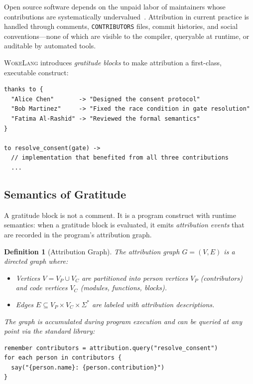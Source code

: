 \documentclass[11pt,a4paper]{article}
\newtheorem{definition}[theorem]{Definition}
\newcommand{\WokeLang}{\textsc{WokeLang}}
\begin{document}
Open source software depends on the unpaid labor of maintainers whose
contributions are systematically
undervalued~\citep{eghbal2020working}.  Attribution in current
practice is handled through comments, \texttt{CONTRIBUTORS} files,
commit histories, and social conventions---none of which are visible
to the compiler, queryable at runtime, or auditable by automated
tools.

\WokeLang{} introduces \emph{gratitude blocks} to make attribution a
first-class, executable construct:

\begin{lstlisting}[caption={Gratitude block}]
thanks to {
  "Alice Chen"       -> "Designed the consent protocol"
  "Bob Martinez"     -> "Fixed the race condition in gate resolution"
  "Fatima Al-Rashid" -> "Reviewed the formal semantics"
}

to resolve_consent(gate) ->
  // implementation that benefited from all three contributions
  ...
\end{lstlisting}

\subsection{Semantics of Gratitude}

A gratitude block is not a comment.  It is a program construct with
runtime semantics: when a gratitude block is evaluated, it emits
\emph{attribution events} that are recorded in the program's
attribution graph.

\begin{definition}[Attribution Graph]
\label{def:attr-graph}
The attribution graph $G = (V, E)$ is a directed graph where:
\begin{itemize}
  \item Vertices $V = V_P \cup V_C$ are partitioned into
    \emph{person vertices} $V_P$ (contributors) and \emph{code
    vertices} $V_C$ (modules, functions, blocks).
  \item Edges $E \subseteq V_P \times V_C \times \Sigma^*$ are
    labeled with attribution descriptions.
\end{itemize}
The graph is accumulated during program execution and can be queried
at any point via the standard library:
\end{definition}

\begin{lstlisting}[caption={Querying the attribution graph}]
remember contributors = attribution.query("resolve_consent")
for each person in contributors {
  say("{person.name}: {person.contribution}")
}
\end{lstlisting}
\end{document}
